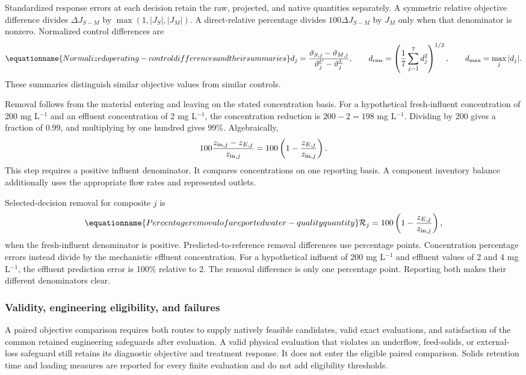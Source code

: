 Standardized response errors at each decision retain the raw, projected, and native quantities separately. A symmetric relative objective difference divides $\Delta J_{S-M}$ by $\max(1,|J_S|,|J_M|)$. A direct-relative percentage divides $100\Delta J_{S-M}$ by $J_M$ only when that denominator is nonzero. Normalized control differences are
\begin{equation}
\equationname{Normalized operating-control differences and their summaries}
d_j=\frac{\vartheta_{S,j}-\vartheta_{M,j}}{\vartheta_j^U-\vartheta_j^L},\qquad
d_{\rm rms}=\left(\frac17\sum_{j=1}^7d_j^2\right)^{1/2},\qquad
d_{\max}=\max_j|d_j|.
\end{equation}
These summaries distinguish similar objective values from similar controls.

Removal follows from the material entering and leaving on the stated concentration basis. For a hypothetical fresh-influent concentration of 200 mg L$^{-1}$ and an effluent concentration of 2 mg L$^{-1}$, the concentration reduction is $200-2=198$ mg L$^{-1}$. Dividing by 200 gives a fraction of 0.99, and multiplying by one hundred gives 99\%. Algebraically,
\[
100\frac{z_{{\rm in},j}-z_{E,j}}{z_{{\rm in},j}}
=100\left(1-\frac{z_{E,j}}{z_{{\rm in},j}}\right).
\]
This step requires a positive influent denominator. It compares concentrations on one reporting basis. A component inventory balance additionally uses the appropriate flow rates and represented outlets.

Selected-decision removal for composite $j$ is
\begin{equation}
\equationname{Percentage removal of a reported water-quality quantity}
\mathcal R_j=100\left(1-\frac{z_{E,j}}{z_{{\rm in},j}}\right),
\end{equation}
when the fresh-influent denominator is positive. Predicted-to-reference removal differences use percentage points. Concentration percentage errors instead divide by the mechanistic effluent concentration. For a hypothetical influent of 200 mg L$^{-1}$ and effluent values of 2 and 4 mg L$^{-1}$, the effluent prediction error is 100\% relative to 2. The removal difference is only one percentage point. Reporting both makes their different denominators clear.

\subsubsection{Validity, engineering eligibility, and failures}

A paired objective comparison requires both routes to supply natively feasible candidates, valid exact evaluations, and satisfaction of the common retained engineering safeguards after evaluation. A valid physical evaluation that violates an underflow, feed-solids, or external-loss safeguard still retains its diagnostic objective and treatment response. It does not enter the eligible paired comparison. Solids retention time and loading measures are reported for every finite evaluation and do not add eligibility thresholds.

